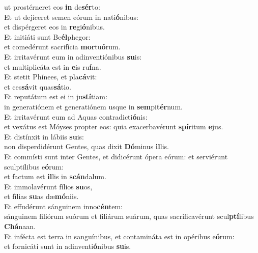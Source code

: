 \evenverse ut prostérneret eos \textbf{in} de\textbf{sér}to:\\
\oddverse Et ut dejíceret semen eórum in nati\textbf{ó}nibus:~\*\\
\oddverse et dispérgeret eos in \textbf{re}gi\textbf{ó}nibus.\\
\evenverse Et initiáti sunt Be\textbf{él}phegor:~\*\\
\evenverse et comedérunt sacrifícia \textbf{mor}tu\textbf{ó}rum.\\
\oddverse Et irritavérunt eum in adinventiónibus \textbf{su}is:~\*\\
\oddverse et multiplicáta est in \textbf{e}is ru\textbf{í}na.\\
\evenverse Et stetit Phínees, et pla\textbf{cá}vit:~\*\\
\evenverse et ces\textbf{sá}vit quas\textbf{sá}tio.\\
\oddverse Et reputátum est ei in ju\textbf{stí}tiam:~\*\\
\oddverse in generatiónem et generatiónem usque in \textbf{sem}pi\textbf{tér}num.\\
\evenverse Et irritavérunt eum ad Aquas contradicti\textbf{ó}nis:~\*\\
\evenverse et vexátus est Móyses propter eos: quia exacerbavérunt \textbf{spí}ritum \textbf{e}jus.\\
\oddverse Et distínxit in lábiis \textbf{su}is:~\*\\
\oddverse non disperdidérunt Gentes, quas dixit \textbf{Dó}minus \textbf{il}lis.\\
\evenverse Et commísti sunt inter Gentes, et didicérunt ópera eórum: et serviérunt sculptílibus e\textbf{ó}rum:~\*\\
\evenverse et factum est \textbf{il}lis in \textbf{scán}dalum.\\
\oddverse Et immolavérunt fílios \textbf{su}os,~\*\\
\oddverse et fílias \textbf{su}as dæ\textbf{mó}niis.\\
\evenverse Et effudérunt sánguinem inno\textbf{cén}tem:~\*\\
\evenverse sánguinem filiórum suórum et filiárum suárum, quas sacrificavérunt scul\textbf{ptí}libus \textbf{Chá}naan.\\
\oddverse Et infécta est terra in sanguínibus, et contamináta est in opéribus e\textbf{ó}rum:~\*\\
\oddverse et fornicáti sunt in adinventi\textbf{ó}nibus \textbf{su}is.\\
